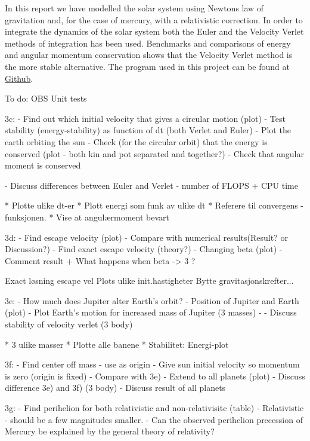 
In this report we have modelled the solar system using Newtons law of gravitation and, for the case of mercury, with a relativistic correction. In order to integrate the dynamics of the solar system both the Euler and the Velocity Verlet methods of integration has been used. Benchmarks and comparisons of energy and angular momentum conservation shows that the Velocity Verlet method is the more stable alternative. 
The program used in this project can be found at \href{https://github.com/kjetka/Project3}{Github}. 



To do:
	OBS Unit tests

	3c: 					  
	- Find out which initial velocity that gives a circular motion (plot)
	- Test stability (energy-stability) as function of dt (both Verlet and Euler)
	- Plot the earth orbiting the sun
	- Check (for the circular orbit) that the energy is conserved (plot - both kin and pot separated and together?)
	- Check that angular moment is conserved
	
	- Discuss differences between Euler and Verlet
		- number of FLOPS + CPU time
	
	
 * Plotte ulike dt-er
 * Plott energi som funk av ulike dt
 * Referere til convergens - funksjonen.
 * Vise at angulærmoment bevart

	3d: 	
	- Find escape velocity (plot)
	 	- Compare with numerical results(Result? or Discussion?)
	- Find exact escape velocity (theory?)
	- Changing beta (plot)
		- Comment result + What happens when beta -> 3 ?
	
					  Exact løsning escape vel
								Plots ulike init.hastigheter
								Bytte gravitasjonskrefter... 
								
	3e:
	- How much does Jupiter alter Earth's orbit?
	- Position of Jupiter and Earth (plot)	
	- Plot Earth's motion for increased mass of Jupiter (3 masses)
	- 
	- Discuss stability of velocity verlet (3 body)

 * 3 ulike masser
 * Plotte alle banene
 * Stabilitet: Energi-plot

	3f:
	- Find center off mass - use as origin
	- Give sun initial velocity so momentum is zero (origin is fixed)
	- Compare with 3e)
	- Extend to all planets (plot)
	- Discuss difference 3e) and 3f) (3 body)
	- Discuss result of all planets
	
	3g:
	- 	Find perihelion for both relativistic and non-relativisitc (table)
	- Relativistic - should be a few magnitudes smaller.	
	-  Can the observed perihelion
precession of Mercury be explained by the general theory of relativity?
	
